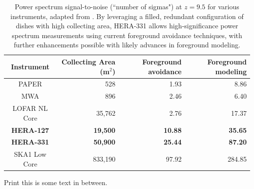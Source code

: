 \documentclass[ars]{copernicus}
\begin{document}
\begin{table}[t]
\small
 \centering
 \begin{tabular}{c||r||r|r} 
\hline
Instrument & Collecting Area (m$^2$) & Foreground avoidance & Foreground modeling \\
\hline
PAPER & 528 & 1.93 & 8.86 \\
MWA & 896 & 2.46 & 6.40 \\
LOFAR NL Core & 35,762 & 2.76 & 17.37 \\
\textbf{HERA-127} & \textbf{19,500} & \textbf{10.88} & \textbf{35.65} \\
\textbf{HERA-331} & \textbf{50,900} & \textbf{25.44} & \textbf{87.20} \\
SKA1 Low Core & 833,190 & 97.92 & 284.85 \\
\end{tabular}
\caption{Power spectrum signal-to-noise (``number of sigmas") at $z=9.5$ for various instruments, adapted from \citet{pober_et_al2014}.  By leveraging a filled, redundant configuration of dishes with high collecting area, HERA-331 allows high-significance power spectrum measurements using current foreground avoidance techniques, with further enhancements possible with likely advances in foreground modeling.}
\label{tab:signif}
\end{table}

Print this is some text in between.
\end{document}

